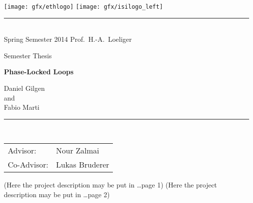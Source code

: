 \documentclass[11pt,a4paper,twoside]{report}
\begin{document}
\pagestyle{plain}

\begin{titlepage}
  \begin{center}
    \texttt{[image: gfx/ethlogo]} \hfill
    \texttt{[image: gfx/isilogo\_left]}
    \rule{\textwidth}{0.5pt}\\[1ex]
    {\Large Spring Semester 2014 \hfill 
      Prof.~H.-A.~Loeliger
    }

    \LARGE Semester Thesis

    \Huge\textbf{
      Phase-Locked Loops
    }
    
    \LARGE{
      Daniel Gilgen\\
      and \\
      Fabio Marti \\
    }
    
  \end{center}
  \rule{\textwidth}{0.5pt}\\[2ex]
  \noindent
  \begin{tabular}{@{}ll@{}}
    \Large Advisor: & \Large Nour Zalmai\\[1ex]
    \Large Co-Advisor: & \Large Lukas Bruderer
  \end{tabular}
\end{titlepage}

\cleardoublepage
(Here the project description may be put in \ldots page 1)
\clearpage
(Here the project description may be put in \ldots page 2)
\cleardoublepage




\pagestyle{fancy}
\renewcommand{\chaptermark}[1]{\markboth{#1}{}}
\renewcommand{\sectionmark}[1]{\markright{\thesection\ #1}}
\fancyhead{}

\fancyhead[LO]{\scshape \contentsname}
\fancyhead[RE]{\scshape \contentsname}
\tableofcontents
\clearpage

\fancyhead[LO]{\scshape \listfigurename}
\fancyhead[RE]{\scshape \listfigurename}
\listoffigures
\clearpage
\end{document}
